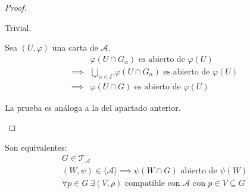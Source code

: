 \documentclass[../VD.tex]{subfiles}
\begin{document}
\begin{proof}\item
  \begin{subproof}
    Trivial.
  \end{subproof}

  \begin{subproof}
    Sea \((U,\varphi)\) una carta de \(\mathcal{A}\).
    \begin{align*}
      &\varphi(U \cap G_{\alpha}) \text{ es abierto de } \varphi(U)\\
      \implies & \bigcup_{\alpha \in \Gamma} \varphi(U \cap G_{\alpha}) \text{ es abierto de } \varphi(U)\\
      \implies & \varphi(U \cap G) \text{ es abierto de } \varphi(U)
    \end{align*}
  \end{subproof}

  \begin{subproof}[\(G_{1}, \dots, G_{n} \in \mathcal{T}_{\mathcal{A}} \implies
    \bigcap_{i = 1}^{n} G_{i} \in \mathcal{T}_{\mathcal{A}}\)]
    La prueba es análoga a la del apartado anterior.
  \end{subproof}
\end{proof}

\begin{lemma}
  \label{lem:topnat-caract}
  Son equivalentes:
  \begin{gather}
    \label{eq:topnat-caract-1}
    G \in \mathcal{T}_{\mathcal{A}}\\
    \label{eq:topnat-caract-2}
    (W, \psi) \in \langle \mathcal{A} \rangle \implies \psi(W \cap G) \text{ abierto
      de } \psi(W)\\
    \label{eq:topnat-caract-3}
    \forall p \in G \  \exists (V,\rho) \text{ compatible con } \mathcal{A}
    \text{ con } p \in V \subseteq G
  \end{gather}
\end{lemma}
\end{document}
